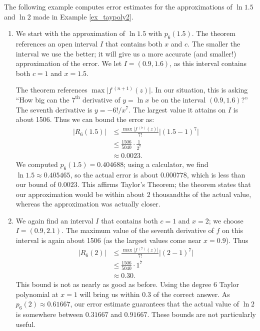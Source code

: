 The following example computes error estimates for the approximations of $\ln 1.5$ and $\ln 2$ made in Example \ref{ex_taypoly2}.\\

{\begin{enumerate}
\item	We start with the approximation of $\ln 1.5$ with $p_6(1.5)$. The theorem references an open interval $I$ that contains both $x$ and $c$. The smaller the interval we use the better; it will give us a more accurate (and smaller!) approximation of the error. We let $I = (0.9,1.6)$, as this interval contains both $c=1$ and $x=1.5$. 

The theorem references $\max\big|f\,^{(n+1)}(z)\big|$. In our situation, this is asking ``How big can the $7^\text{th}$ derivative of $y=\ln x$ be on the interval $(0.9,1.6)$?'' The seventh derivative is $y = -6!/x^7$. The largest value it attains on $I$ is about 1506. Thus we can bound the error as:
\begin{align*}
\big|R_6(1.5)\big| &\leq \frac{\max\big|f\,^{(7)}(z)\big|}{7!}\big|(1.5-1)^7\big|\\
					&\leq \frac{1506}{5040}\cdot\frac1{2^7}\\
					&\approx 0.0023.
\end{align*}
\noindent%
We computed $p_6(1.5) = 0.404688$; using a calculator, we find $\ln 1.5 \approx 0.405465$, so the actual error is about $0.000778$, which is less than our bound of $0.0023$. This affirms Taylor's Theorem; the theorem states that our approximation would be within about 2 thousandths of the actual value, whereas the approximation was actually closer.

\item		We again find an interval $I$ that contains both $c=1$ and $x=2$; we choose $I = (0.9,2.1)$. The maximum value of the seventh derivative of $f$ on this interval is again about 1506 (as the largest values come near $x=0.9$). Thus 
\begin{align*}
\big| R_6(2)\big| &\leq \frac{\max\big|f\,^{(7)}(z)\big|}{7!}\big|(2-1)^7\big|\\
					&\leq \frac{1506}{5040}\cdot1^7\\
					&\approx 0.30.
\end{align*}
This bound is not as nearly as good as before. Using the degree 6 Taylor polynomial at $x =1$ will bring us within 0.3 of the correct answer. As $p_6(2)\approx 0.61667$, our error estimate guarantees that the actual value of $\ln 2$ is somewhere between $0.31667$ and $0.91667$. These bounds are not particularly useful.


\end{enumerate}}
